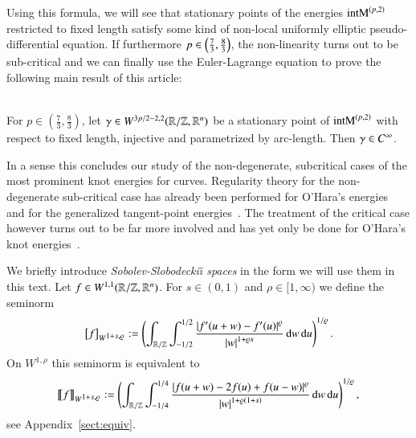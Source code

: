 

Using this formula, we will see that stationary points of 
the energies $\E [p,2]$ restricted to fixed length satisfy some kind of non-local uniformly elliptic 
pseudo-differential equation. If furthermore  $p \in\br{\tfrac73,\tfrac83}$,
the non-linearity turns out to be sub-critical and  we can finally use the Euler-Lagrange equation
to prove the following main result of this article:

\begin{theorem}[\secD]\label{thm:smooth}\hfill\\
 For $p\in(\tfrac73,\tfrac83)$, let $\g\in\W[3p/2-2,2]\rzd$ be a stationary point of $\E[p,2]$ with respect to fixed length, injective and parametrized by arc-length.
 Then $\g\in C^{\infty}$.
\end{theorem}

In a sense this concludes our study of the non-degenerate, 
subcritical cases of the most prominent knot energies
for curves. Regularity theory for the non-degenerate sub-critical case
has already been performed for O'Hara's energies~\cite{blatt-reiter2}
and for the generalized tangent-point energies~\cite{blatt-reiter3}.
The treatment of the critical case however
turns out to be far more involved and has yet only be done for 
O'Hara's knot energies~\cite{blatt-reiter-schikorra}.

We briefly introduce \emph{Sobolev-Slobodecki{\u\i} spaces} in the form
we will use them in this text.
Let $f\in W^{1,1}\rzd$. For $s\in(0,1)$ and $\rho\in[1,\infty)$ we define the seminorm
\begin{equation}\label{eq:Wsemi}
 \seminorm{f}_{\W[1+s,\rho]} := \br{\int_{{\R/\Z}}\int_{-1/2}^{1/2}
 \frac{\abs{f'(u+w)-f'(u)}^\rho}{\abs w^{1+\rho s}} \d w\d u}^{1/\rho}.
\end{equation}
On $W^{1,\rho}$ this seminorm is equivalent to
\begin{equation}\label{eq:Wsemi'}
 \seminormv{f}_{\W[1+s,\rho]} := \br{\int_{{\R/\Z}}\int_{-1/4}^{1/4}
 \frac{\abs{f(u+w)-2f(u)+f(u-w)}^\rho}{\abs w^{1+\rho(1+s)}} \d w\d u}^{1/\rho},
\end{equation}
see Appendix~\ref{sect:equiv}.

